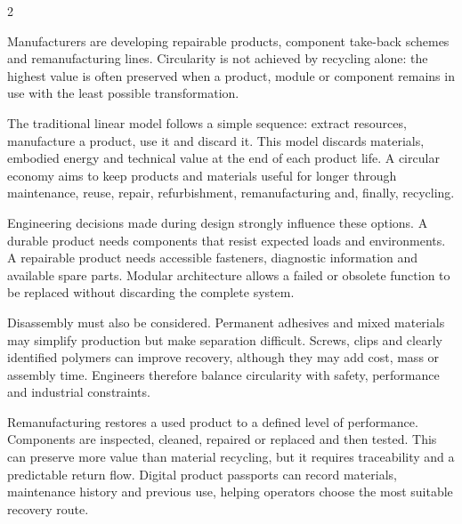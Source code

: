 

\begin{multicols}{2}
\begin{engineeringnews}
Manufacturers are developing repairable products, component take-back schemes and remanufacturing
lines. Circularity is not achieved by recycling alone: the highest value is often preserved when a
product, module or component remains in use with the least possible transformation.
\end{engineeringnews}

\begin{ecarticle}
The traditional linear model follows a simple sequence: extract resources, manufacture a product,
use it and discard it. This model discards materials, embodied energy and technical value at the end of each product life.
A circular economy aims to keep products and materials useful for longer through maintenance, reuse,
repair, refurbishment, remanufacturing and, finally, recycling.

Engineering decisions made during design strongly influence these options. A durable product needs
components that resist expected loads and environments. A repairable product needs accessible
fasteners, diagnostic information and available spare parts. Modular architecture allows a failed or
obsolete function to be replaced without discarding the complete system.

Disassembly must also be considered. Permanent adhesives and mixed materials may simplify production
but make separation difficult. Screws, clips and clearly identified polymers can improve recovery,
although they may add cost, mass or assembly time. Engineers therefore balance circularity with safety,
performance and industrial constraints.

Remanufacturing restores a used product to a defined level of performance. Components are inspected,
cleaned, repaired or replaced and then tested. This can preserve more value than material recycling,
but it requires traceability and a predictable return flow. Digital product passports can record
materials, maintenance history and previous use, helping operators choose the most suitable recovery route.


\end{ecarticle}
\end{multicols}
